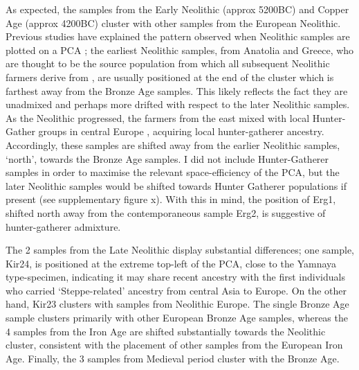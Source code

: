 As expected, the samples from the Early Neolithic (approx 5200BC) and Copper Age (approx 4200BC) cluster with other samples from the European Neolithic. Previous studies have explained the pattern observed when Neolithic samples are plotted on a PCA \cite{Lipson2017b}; the earliest Neolithic samples, from Anatolia and Greece, who are thought to be the source population from which all subsequent Neolithic farmers derive from \cite{Hofmanova2016, Haak2010, haak2005ancient, bramanti2009genetic, Lazaridis2014}, are usually positioned at the end of the cluster which is farthest away from the Bronze Age samples. This likely reflects the fact they are unadmixed and perhaps more drifted with respect to the later Neolithic samples. As the Neolithic progressed, the farmers from the east mixed with local Hunter-Gather groups in central Europe \cite{Lipson2017b}, acquiring local hunter-gatherer ancestry. Accordingly, these samples are shifted away from the earlier Neolithic samples, `north', towards the Bronze Age samples. I did not include Hunter-Gatherer samples in order to maximise the relevant space-efficiency of the PCA, but the later Neolithic samples would be shifted towards Hunter Gatherer populations if present (see supplementary figure x). With this in mind, the position of Erg1, shifted north away from the contemporaneous sample Erg2, is suggestive of hunter-gatherer admixture. 

The 2 samples from the Late Neolithic display substantial differences; one sample, Kir24, is  positioned at the extreme top-left of the PCA, close to the Yamnaya type-specimen, indicating it may share recent ancestry with the first individuals who carried `Steppe-related' ancestry from central Asia to Europe. On the other hand, Kir23 clusters with samples from Neolithic Europe. The single Bronze Age sample clusters primarily with other European Bronze Age samples, whereas the 4 samples from the Iron Age are shifted substantially towards the Neolithic cluster, consistent with the placement of other samples from the European Iron Age. Finally, the 3 samples from Medieval period cluster with the Bronze Age. 

